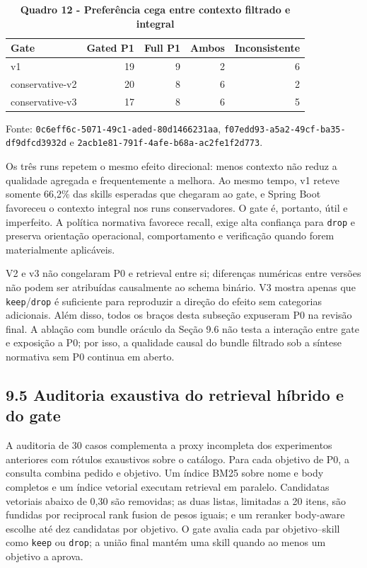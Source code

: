 \documentclass[12pt,a4paper]{article}
\begin{document}
\begin{table}[H]
\centering
\caption*{\textbf{Quadro 12 - Preferência cega entre contexto filtrado e integral}}
\small
\renewcommand{\arraystretch}{1.12}
\begin{tabular}{|l|r|r|r|r|}
\hline
\textbf{Gate} & \textbf{Gated P1} & \textbf{Full P1} & \textbf{Ambos} & \textbf{Inconsistente} \\
\hline
v1 & 19 & 9 & 2 & 6 \\
\hline
conservative-v2 & 20 & 8 & 6 & 2 \\
\hline
conservative-v3 & 17 & 8 & 6 & 5 \\
\hline
\end{tabular}
\par\smallskip\raggedright\small Fonte: \texttt{0c6eff6c-5071-49c1-aded-80d1466231aa}, \texttt{f07edd93-a5a2-49cf-ba35-df9dfcd3932d} e \texttt{2acb1e81-791f-4afe-b68a-ac2fe1f2d773}.
\end{table}

Os três runs repetem o mesmo efeito direcional: menos contexto não reduz a qualidade agregada e frequentemente a melhora. Ao mesmo tempo, v1 reteve somente 66,2\% das skills esperadas que chegaram ao gate, e Spring Boot favoreceu o contexto integral nos runs conservadores. O gate é, portanto, útil e imperfeito. A política normativa favorece recall, exige alta confiança para \texttt{drop} e preserva orientação operacional, comportamento e verificação quando forem materialmente aplicáveis.

V2 e v3 não congelaram P0 e retrieval entre si; diferenças numéricas entre versões não podem ser atribuídas causalmente ao schema binário. V3 mostra apenas que \texttt{keep}/\texttt{drop} é suficiente para reproduzir a direção do efeito sem categorias adicionais. Além disso, todos os braços desta subseção expuseram P0 na revisão final. A ablação com bundle oráculo da Seção 9.6 não testa a interação entre gate e exposição a P0; por isso, a qualidade causal do bundle filtrado sob a síntese normativa sem P0 continua em aberto.

\subsection*{9.5 Auditoria exaustiva do retrieval híbrido e do gate}

A auditoria de 30 casos complementa a proxy incompleta dos experimentos anteriores com rótulos exaustivos sobre o catálogo. Para cada objetivo de P0, a consulta combina pedido e objetivo. Um índice BM25 sobre nome e body completos e um índice vetorial executam retrieval em paralelo. Candidatas vetoriais abaixo de 0,30 são removidas; as duas listas, limitadas a 20 itens, são fundidas por reciprocal rank fusion de pesos iguais; e um reranker body-aware escolhe até dez candidatas por objetivo. O gate avalia cada par objetivo--skill como \texttt{keep} ou \texttt{drop}; a união final mantém uma skill quando ao menos um objetivo a aprova.
\end{document}
